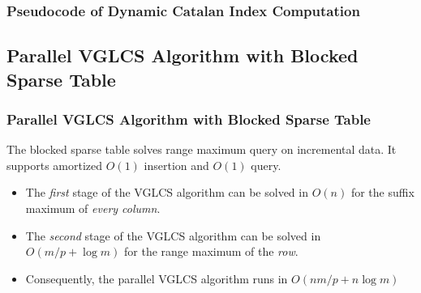 \begin{withoutheadline}
\begin{frame}
	\frametitle{Pseudocode of Dynamic Catalan Index Computation}
	\begin{center}
		\scalebox{.8} { \begin{minipage}{\textwidth}
			
			\end{minipage}
		}
	\end{center}
\end{frame}
\end{withoutheadline}

\subsection{Parallel VGLCS Algorithm with Blocked Sparse Table}
\begin{frame}
	\frametitle{Parallel VGLCS Algorithm with Blocked Sparse Table}
	The blocked sparse table solves range maximum query on incremental
	data.  It supports amortized $O(1)$ insertion and $O(1)$ query.
	\begin{itemize}
		\setlength\itemsep{1em}
		\item 
			The {\em first} stage of the VGLCS algorithm can be solved
			in $O(n)$ for the suffix maximum of {\em every column}.
		\item 
			The {\em second} stage of the VGLCS algorithm can be solved
			in $O(m/p + \log m)$ for the range maximum of the {\em row}.
		\item
			Consequently, the parallel VGLCS algorithm runs in $O(nm/p+n\log m)$
	\end{itemize}
\end{frame}